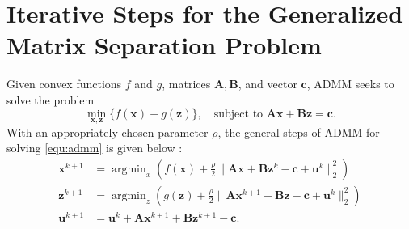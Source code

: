 \documentclass[10pt]{article}  	%
\theoremstyle{definition}
\theoremstyle{definition}
\newtheorem{remark}[theorem]{Remark}
\DeclareMathOperator*{\argmin}{argmin}
\newcommand{\R}{{\mathbb{R}}}
\newcommand{\vb}{\mathbf{b}}
\newcommand{\vc}{\mathbf{c}}
\newcommand{\vu}{\mathbf{u}}
\newcommand{\vx}{\mathbf{x}}
\newcommand{\vy}{\mathbf{y}}
\newcommand{\vz}{\mathbf{z}}
\newcommand{\mA}{\mathbf{A}}
\newcommand{\mB}{\mathbf{B}}
\newcommand{\mI}{\mathbf{I}}
\newcommand{\mL}{\mathbf{L}}
\theoremstyle{remark}
\begin{document}
%







\section{Iterative Steps for the Generalized Matrix Separation Problem} \label{sec:iter1d}

Given convex functions $f$ and $g$, matrices $\mA, \mB$, and vector $\vc$, ADMM seeks to solve the problem 
\begin{equation}\label{equ:admm}
\min_{\vx, \vz} \{f(\vx)+g(\vz)\}, \quad\text{subject to }\mA\vx+\mB\vz=\vc.
\end{equation}
With an appropriately chosen parameter $\rho$, the general steps of ADMM for solving \eqref{equ:admm} is given below  \cite[(3.5)--(3.7)]{BS11}:
\begin{align}\label{equ:admm1}
\vx^{k+1} &= \argmin_x \left(f(\vx)+\frac{\rho}{2}\|\mA\vx+\mB\vz^k-\vc+\vu^k\|_2^2\right)\\
\vz^{k+1} &= \argmin_z \left(g(\vz)+\frac{\rho}{2}\|\mA\vx^{k+1}+\mB\vz-\vc+\vu^k\|_2^2\right)\\\label{equ:admm3}
\vu^{k+1} &= \vu^k + \mA\vx^{k+1} + \mB\vz^{k+1}-\vc.
\end{align}
\end{document}
